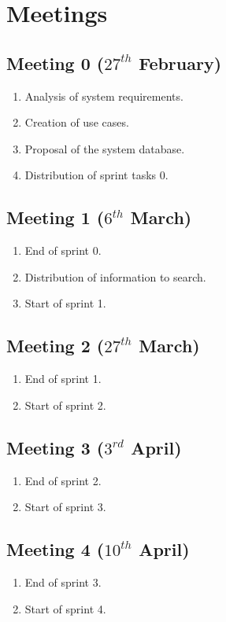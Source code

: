 \section{Meetings}
\subsection{Meeting 0 ($27^{th}$ February)}
\begin{enumerate}
	\item Analysis of system requirements.
	\item Creation of use cases.
	\item Proposal of the system database.
	\item Distribution of sprint tasks 0.
\end{enumerate}

\subsection{Meeting 1 ($6^{th}$ March)}
\begin{enumerate}
	\item End of sprint 0.
	\item Distribution of information to search.
	\item Start of sprint 1.
\end{enumerate}

\subsection{Meeting 2 ($27^{th}$ March)}
\begin{enumerate}
	\item End of sprint 1.
	\item Start of sprint 2.
\end{enumerate}

\subsection{Meeting 3 ($3^{rd}$ April)}
\begin{enumerate}
	\item End of sprint 2.
	\item Start of sprint 3.
\end{enumerate}

\subsection{Meeting 4 ($10^{th}$ April)}
\begin{enumerate}
	\item End of sprint 3.
	\item Start of sprint 4.
\end{enumerate}

